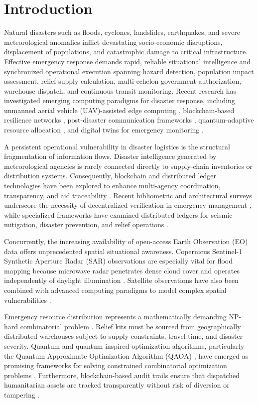 \documentclass[conference]{IEEEtran}
\begin{document}
\section{Introduction}
Natural disasters such as floods, cyclones, landslides, earthquakes, and severe meteorological anomalies inflict devastating socio-economic disruptions, displacement of populations, and catastrophic damage to critical infrastructure. Effective emergency response demands rapid, reliable situational intelligence and synchronized operational execution spanning hazard detection, population impact assessment, relief supply calculation, multi-echelon government authorization, warehouse dispatch, and continuous transit monitoring. Recent research has investigated emerging computing paradigms for disaster response, including unmanned aerial vehicle (UAV)-assisted edge computing \cite{ref1}, blockchain-based resilience networks \cite{ref2}, post-disaster communication frameworks \cite{ref3}, quantum-adaptive resource allocation \cite{ref4}, and digital twins for emergency monitoring \cite{ref5}.

A persistent operational vulnerability in disaster logistics is the structural fragmentation of information flows. Disaster intelligence generated by meteorological agencies is rarely connected directly to supply-chain inventories or distribution systems. Consequently, blockchain and distributed ledger technologies have been explored to enhance multi-agency coordination, transparency, and aid traceability \cite{ref6, ref7, ref8}. Recent bibliometric and architectural surveys underscore the necessity of decentralized verification in emergency management \cite{ref9, ref10}, while specialized frameworks have examined distributed ledgers for seismic mitigation, disaster prevention, and relief operations \cite{ref11, ref12}.

Concurrently, the increasing availability of open-access Earth Observation (EO) data offers unprecedented spatial situational awareness. Copernicus Sentinel-1 Synthetic Aperture Radar (SAR) observations are especially vital for flood mapping because microwave radar penetrates dense cloud cover and operates independently of daylight illumination \cite{ref13, ref14}. Satellite observations have also been combined with advanced computing paradigms to model complex spatial vulnerabilities \cite{ref15}.

Emergency resource distribution represents a mathematically demanding NP-hard combinatorial problem \cite{ref16}. Relief kits must be sourced from geographically distributed warehouses subject to supply constraints, travel time, and disaster severity. Quantum and quantum-inspired optimization algorithms, particularly the Quantum Approximate Optimization Algorithm (QAOA) \cite{ref22}, have emerged as promising frameworks for solving constrained combinatorial optimization problems \cite{ref1, ref4}. Furthermore, blockchain-based audit trails ensure that dispatched humanitarian assets are tracked transparently without risk of diversion or tampering \cite{ref17, ref18, ref19, ref20, ref21}.
\end{document}
